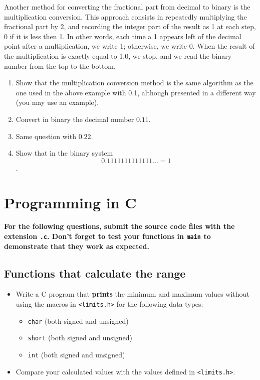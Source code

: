 \documentclass{article}
\begin{document}
Another method for converting the fractional part from decimal to binary is the multiplication conversion. This approach consists in repeatedly multiplying the fractional part by 2, and recording the integer part of the result as 1 at each step, 0 if it is less then 1. In other words, each time a 1 appears left of the decimal point after a multiplication, we write 1; otherwise, we write 0. When the result of the multiplication is exactly equal to 1.0, we stop, and we read the binary number from the top to the bottom.


\begin{enumerate}
\item Show that the multiplication conversion method is the same algorithm as the one used in the above example with 0.1, although presented in a different way (you may use an example). 

\item Convert in binary the decimal number $0.11$. 

\item Same question with $0.22$.

\item Show that in the binary system $$0.1111111111111\dots = 1 $$.
\end{enumerate}


\section{Programming in C}

\textbf{For the following questions, submit the source code files with the extension \texttt{.c}. Don't forget to test your functions in \texttt{main} to demonstrate that they work as expected.}

\subsection{Functions that calculate the range}

\begin{itemize}

\item Write a C program that \textbf{prints} the minimum and maximum values without using the macros in \texttt{<limits.h>} for the following data types:

\begin{itemize}
\item \texttt{char} (both signed and unsigned)
\item \texttt{short} (both signed and unsigned)
\item \texttt{int} (both signed and unsigned)
\end{itemize}

\item Compare your calculated values with the values defined in \texttt{<limits.h>}.
  
\end{itemize}  
\end{document}
